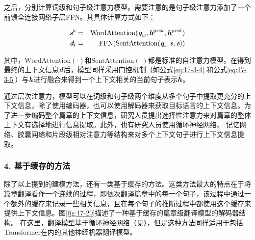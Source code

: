 \noindent 之后，分别计算词级和句子级注意力模型。需要注意的是句子级注意力添加了一个前馈全连接网络子层FFN。其具体计算方式如下：

\begin{eqnarray}
\textbf{\em s}^k&=&\textrm{WordAttention}(\textbf{\em q}_{w},\textbf{\em h}^{\textrm {pre}k},\textbf{\em h}^{\textrm{pre}k})
\label{eq:17-3-7}\\
\textbf{\em d}_t&=&\textrm{FFN}(\textrm{SentAttention}(\textbf{\em q}_{s},\textbf{\em s},\textbf{\em s}))
\label{eq:17-3-9}
\end{eqnarray}

\noindent 其中，$\textrm{WordAttention}(\cdot)$和$\textrm{SentAttention}(\cdot)$都是标准的自注意力模型。在得到最终的上下文信息$\textbf{\em d}$后，模型同样采用门控机制（如公式\eqref{eq:17-3-4} 和公式\eqref{eq:17-3-5}）与$\textbf{\em h}$进行融合来得到一个上下文相关的当前句子表示$\widetilde{\textbf{\em h}}$。

\parinterval 通过层次注意力，模型可以在词级和句子级两个维度从多个句子中提取更充分的上下文信息，除了使用编码器，也可以使用解码器来获取目标语言的上下文信息。为了进一步编码整个篇章的上下文信息，研究人员提出选择性注意力来对篇章的整体上下文有选择地进行信息提取。此外，也有研究人员使用循环神经网络、 记忆网络、胶囊网络和片段级相对注意力等结构来对多个上下文句子进行上下文信息提取。


\subsubsection{4. 基于缓存的方法}

\parinterval 除了以上提到的建模方法，还有一类基于缓存的方法。这类方法最大的特点在于将篇章翻译看作一个连续的过程，即依次翻译篇章中的每一个句子，该过程中通过一个额外的缓存来记录一些相关信息，且在每个句子的推断过程中都使用这个缓存来提供上下文信息。图\ref{fig:17-20}描述了一种基于缓存的篇章级翻译模型的解码器结构。 在这里，翻译模型基于循环神经网络（见{\chapterten}），但是这种方法同样适用于包括Transformer在内的其他神经机器翻译模型。

